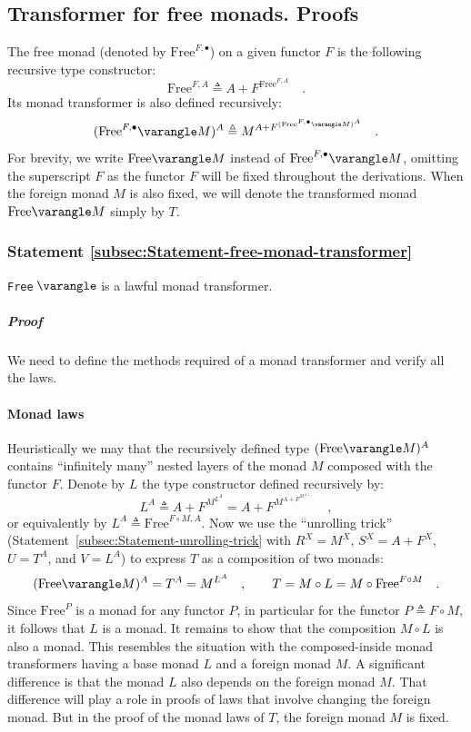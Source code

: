 \subsection{Transformer for free monads. Proofs}

The free monad (denoted by $\text{Free}^{F,\bullet}$) on a given
functor $F$ is the following recursive type constructor:
\[
\text{Free}^{F,A}\triangleq A+F^{\text{Free}^{F,A}}\quad.
\]
Its monad transformer is also defined recursively:
\[
(\text{Free}^{F,\bullet}\varangle M)^{A}\triangleq M^{A+F^{(\text{Free}^{F,\bullet}\varangle M)^{A}}}\quad.
\]
For brevity, we write $\text{Free}\varangle M$ instead of $\text{Free}^{F,\bullet}\varangle M$,
omitting the superscript $F$ as the functor $F$ will be fixed throughout
the derivations. When the foreign monad $M$ is also fixed, we will
denote the transformed monad $\text{Free}\varangle M$ simply by $T$.

\subsubsection{Statement \label{subsec:Statement-free-monad-transformer}\ref{subsec:Statement-free-monad-transformer}}

\lstinline!Free!$\,\varangle$ is a lawful monad transformer.

\subparagraph{Proof}

We need to define the methods required of a monad transformer and
verify all the laws. 

\paragraph{Monad laws}

Heuristically we may that the recursively defined type $(\text{Free}\varangle M)^{A}$
contains \textsf{``}infinitely many\textsf{''} nested layers of the monad $M$ composed
with the functor $F$. Denote by $L$ the type constructor defined
recursively by:
\[
L^{A}\triangleq A+F^{M^{L^{A}}}=A+F^{M^{A+F^{M^{A+...}}}}\quad,
\]
or equivalently by $L^{A}\triangleq\text{Free}^{F\circ M,A}$. Now
we use the \textsf{``}unrolling trick\textsf{''}
(Statement~\ref{subsec:Statement-unrolling-trick} with $R^{X}=M^{X}$,
$S^{X}=A+F^{X}$, $U=T^{A}$, and $V=L^{A}$) to express $T$ as a
composition of two monads:
\[
(\text{Free}\varangle M)^{A}=T^{A}=M^{L^{A}}\quad,\quad\quad T=M\circ L=M\circ\text{Free}^{F\circ M}\quad.
\]
Since $\text{Free}^{P}$ is a monad for any functor $P$, in particular
for the functor $P\triangleq F\circ M$, it follows that $L$ is a
monad. It remains to show that the composition $M\circ L$ is also
a monad. This resembles the situation with the composed-inside monad
transformers having a base monad $L$ and a foreign monad $M$. A
significant difference is that the monad $L$ also depends on the
foreign monad $M$. That difference will play a role in proofs of
laws that involve changing the foreign monad. But in the proof of
the monad laws of $T$, the foreign monad $M$ is fixed. 

